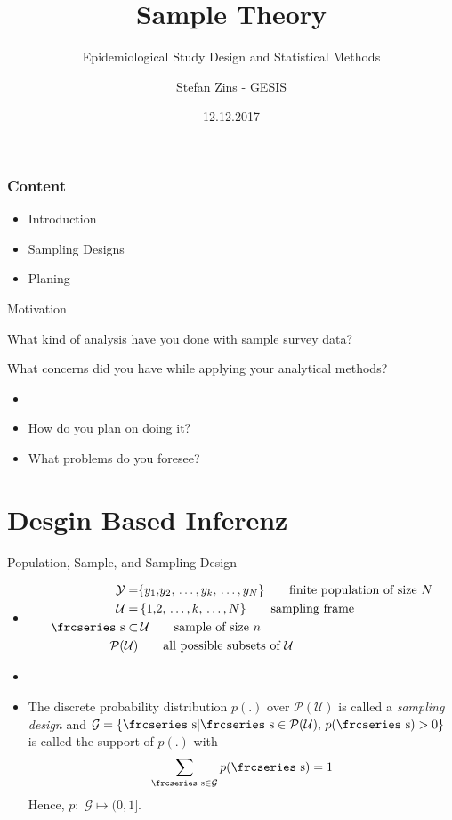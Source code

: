 \documentclass{beamer}\usepackage[]{graphicx}\usepackage[]{color}
\title{Sample Theory}
\subtitle{Epidemiological Study Design and Statistical Methods}
\author{Stefan Zins - GESIS}
\date{12.12.2017}
\newcommand{\eqname}[1]{\tag*{#1}} %
\newcommand{\textfrc}[1]{{\frcseries#1}}
\newcommand{\mathfrc}[1]{\text{\textfrc{#1}}}
\begin{document}
\gesismaketitle %

\begin{frame}%
  \frametitle{Content}
  
  \begin{itemize}
  \item Introduction
  \item Sampling Designs
  \item Planing
  \end{itemize}


\end{frame}


\begin{frame}{Motivation}

What kind of analysis have you done with sample survey data?

What concerns did you have while applying your analytical methods?

  \begin{itemize}
    \item<1-2,3->  
    \item<3-> How do you plan on doing it?  \vspace{1cm}
    \item<4>  What problems do you foresee?
  \end{itemize}
\end{frame}


\section{Desgin Based Inferenz}



\begin{frame}{Population, Sample, and Sampling Design}

 \begin{itemize}
 \item[] 
 \begin{align}
 \mathcal{Y} = & \{ y_1{,}y_2{,}\,\ldots{,}\,y_k{,}\,\ldots{,}\,y_N \} \eqname{finite population of size $N$} \\
 \mathcal{U} = &\, \{ 1{,}2{,}\,\ldots{,}\,k{,}\,\ldots{,}\,N \} \eqname{sampling frame} \\
 \mathfrc{s} \subset &\, \mathcal{U} \eqname{sample of size $n$} \\
 \mathcal{P}(\mathcal{U}) & \eqname{all possible subsets of $\mathcal{U}$}
 \end{align}
 \item[]
\item[]
The discrete probability distribution $p(.)$ over $\mathcal{P}(\mathcal{U})$ is called
a \emph{sampling design} and  $\mathcal{G}=\{ \mathfrc{s} | \mathfrc{s} \in
\mathcal{P}(\mathcal{U}),\, p(\mathfrc{s}) > 0 \}$ is called the support of $p(.)$ with
$$
\sum_{\mathfrc{s} \in \mathcal{G}} p(\mathfrc{s}) = 1
$$
Hence, $p: \; \mathcal{G} \mapsto (0, 1]$.
 \end{itemize}
\end{frame}
\end{document}
